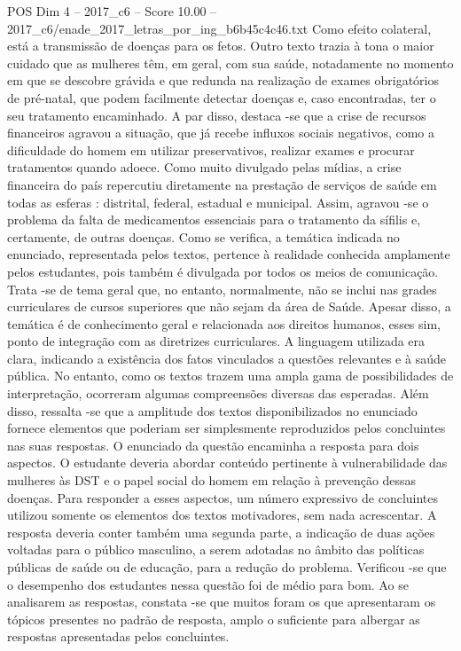 \begin{textsample}{POS Dim 4 – 2017\_c6 – Score 10.00 – 2017\_c6/enade\_2017\_letras\_por\_ing\_b6b45c4c46.txt}
Como efeito colateral, está a transmissão de doenças para os fetos.
Outro texto trazia à tona o maior cuidado que as mulheres têm, em geral, com sua saúde, notadamente no momento em que se descobre grávida e que redunda na realização de exames obrigatórios de pré-natal, que podem facilmente detectar doenças e, caso encontradas, ter o seu tratamento encaminhado.
A par disso, destaca -se que a crise de recursos financeiros agravou a situação, que já recebe influxos sociais negativos, como a dificuldade do homem em utilizar preservativos, realizar exames e procurar tratamentos quando adoece.
Como muito divulgado pelas mídias, a crise financeira do país repercutiu diretamente na prestação de serviços de saúde em todas as esferas : distrital, federal, estadual e municipal.
Assim, agravou -se o problema da falta de medicamentos essenciais para o tratamento da sífilis e, certamente, de outras doenças.
Como se verifica, a temática indicada no enunciado, representada pelos textos, pertence à realidade conhecida amplamente pelos estudantes, pois também é divulgada por todos os meios de comunicação.
Trata -se de tema geral que, no entanto, normalmente, não se inclui nas grades curriculares de cursos superiores que não sejam da área de Saúde.
Apesar disso, a temática é de conhecimento geral e relacionada aos direitos humanos, esses sim, ponto de integração com as diretrizes curriculares.
A linguagem utilizada era clara, indicando a existência dos fatos vinculados a questões relevantes e à saúde pública.
No entanto, como os textos trazem uma ampla gama de possibilidades de interpretação, ocorreram algumas compreensões diversas das esperadas.
Além disso, ressalta -se que a amplitude dos textos disponibilizados no enunciado fornece elementos que poderiam ser simplesmente reproduzidos pelos concluintes nas suas respostas.
O enunciado da questão encaminha a resposta para dois aspectos.
O estudante deveria abordar conteúdo pertinente à vulnerabilidade das mulheres às DST e o papel social do homem em relação à prevenção dessas doenças.
Para responder a esses aspectos, um número expressivo de concluintes utilizou somente os elementos dos textos motivadores, sem nada acrescentar.
A resposta deveria conter também uma segunda parte, a indicação de duas ações voltadas para o público masculino, a serem adotadas no âmbito das políticas públicas de saúde ou de educação, para a redução do problema.
Verificou -se que o desempenho dos estudantes nessa questão foi de médio para bom.
Ao se analisarem as respostas, constata -se que muitos foram os que apresentaram os tópicos presentes no padrão de resposta, amplo o suficiente para albergar as respostas apresentadas pelos concluintes.

\end{textsample}
